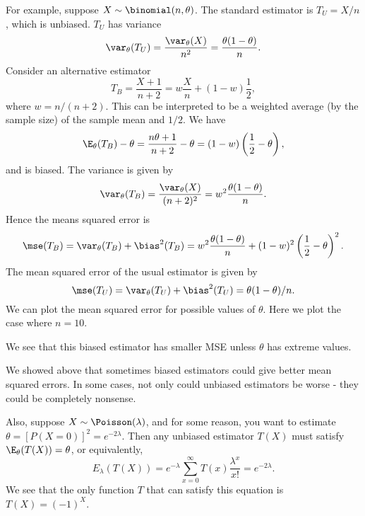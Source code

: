 \documentclass[a4paper]{article}
\begin{document}
For example, suppose $X\sim \binomial(n, \theta)$. The standard estimator is $T_U = X/n$, which is unbiased. $T_U$ has variance
\[
  \var_\theta(T_U) = \frac{\var_\theta(X)}{n^2} = \frac{\theta(1 - \theta)}{n}.
\]
Consider an alternative estimator
\[
  T_B = \frac{X + 1}{n + 2} = w\frac{X}{n} + (1 - w)\frac{1}{2},
\]
where $w = n/(n + 2)$. This can be interpreted to be a weighted average (by the sample size) of the sample mean and $1/2$. We have
\[
  \E_\theta(T_B) - \theta = \frac{n\theta + 1}{n + 2} - \theta = (1 - w)\left(\frac{1}{2} - \theta\right),
\]
and is biased. The variance is given by
\[
  \var_\theta(T_B) = \frac{\var_\theta(X)}{(n + 2)^2} = w^2\frac{\theta(1 - \theta)}{n}.
\]
Hence the means squared error is
\[
  \mse (T_B) = \var_\theta(T_B) + \bias^2(T_B) = w^2\frac{\theta(1 - \theta)}{n} + (1 - w)^2\left(\frac{1}{2} - \theta\right)^2.
\]
The mean squared error of the usual estimator is given by
\[
  \mse (T_U) = \var_\theta(T_U) + \bias^2(T_U) = \theta(1 - \theta)/n.
\]
We can plot the mean squared error for possible values of $\theta$. Here we plot the case where $n = 10$.
\begin{center}
\end{center}
We see that this biased estimator has smaller MSE unless $\theta$ has extreme values.

We showed above that sometimes biased estimators could give better mean squared errors. In some cases, not only could unbiased estimators be worse - they could be completely nonsense.

Also, suppose $X\sim \Poisson(\lambda)$, and for some reason, you want to estimate $\theta = [P(X = 0)]^2 = e^{-2\lambda}$. Then any unbiased estimator $T(X)$ must satisfy $\E_\theta(T(X)) = \theta$, or equivalently,
\[
  E_\lambda(T(X)) = e^{-\lambda}\sum_{x = 0}^\infty T(x) \frac{\lambda^x}{x!} = e^{-2\lambda}.
\]
We see that the only function $T$ that can satisfy this equation is $T(X) = (-1)^X$.
\end{document}
